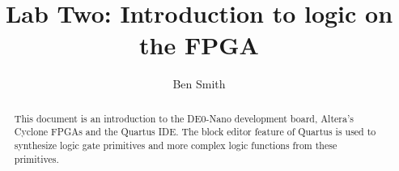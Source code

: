 
\title{Lab Two: Introduction to logic on the FPGA}
\author{Ben Smith}
\newcommand{\KEYWORDS}{Logic Gates, Verilog, FPGA, Signaltap, Synthesis}
\newcommand{\ABSTRACT}{This document is an introduction to the DE0-Nano development board, Altera's Cyclone FPGAs and the Quartus IDE. The block editor feature of Quartus is used to synthesize logic gate primitives and more complex logic functions from these primitives.}




\maketitle
  \begin{abstract}
    This document is an introduction to the DE0-Nano development board, Altera's Cyclone FPGAs and the Quartus IDE. The block editor feature of Quartus is used to synthesize logic gate primitives and more complex logic functions from these primitives.
  \end{abstract}
  
